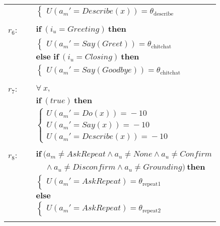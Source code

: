 \begin{footnotesize}
\begin{longtable}{p{2cm}l}
 & \;\;\;\;\; $ \begin{cases}U(\mathit{a_m}'\!=\!\mathit{Describe(x)})\!=\!\theta_{\mathrm{describe}} \end{cases}$ \\ \\[-1mm]
$r_{6}$: \ \ & $ \textbf{if} \ (\mathit{i_u}\!=\!\mathit{Greeting}) \ \textbf{then} $ \\
 & \;\;\;\;\; $ \begin{cases}U(\mathit{a_m}'\!=\!\mathit{Say(Greet)})\!=\!\theta_{\mathrm{chitchat}} \end{cases}$ \vspace{1mm} \\ & $ \textbf{else if} \ (\mathit{i_u}\!=\!\mathit{Closing}) \ \textbf{then}$ \\
& \;\;\;\;\; $ \begin{cases}U(\mathit{a_m}'\!=\!\mathit{Say(Goodbye)})\!=\!\theta_{\mathrm{chitchat}} \end{cases}$ \\ \\[-1mm]
$r_{7}$: \ \ & $\forall \ x,$ \\
& $ \textbf{if} \  (\mathit{true}) \  \textbf{then}$ \\ & \;\;\;\;\; $\begin{cases}U(\mathit{a_m}'\!=\!\mathit{Do(x)})\!=\!-10 \\
U(\mathit{a_m}'\!=\!\mathit{Say(x)})\!=\!-10 \\
U(\mathit{a_m}'\!=\!\mathit{Describe(x)})\!=\!-10 \end{cases}$ \\ \\[-1mm]
$r_{8}$: \ \ & $ \textbf{if} \ (\mathit{a_m}\!\neq\!\mathit{AskRepeat} \land \mathit{a_u}\!\neq\!\mathit{None} \land \mathit{a_u}\!\neq\!\mathit{Confirm} $ \\ & $\ \ \ \ \  \land \mathit{a_u}\!\neq\!\mathit{Disconfirm} \land \mathit{a_u}\!\neq\!\mathit{Grounding}) \ \textbf{then} $ \\
 & \;\;\;\;\; $ \begin{cases}U(\mathit{a_m}'\!=\!\mathit{AskRepeat})\!=\!\theta_{\mathrm{repeat1}} \end{cases}$ \vspace{1mm} \\ & $ \textbf{else}$ \\
& \;\;\;\;\; $ \begin{cases}U(\mathit{a_m}'\!=\!\mathit{AskRepeat})\!=\!\theta_{\mathrm{repeat2}} \end{cases}$ \\ \\[-1mm]

\end{longtable}
\end{footnotesize}
